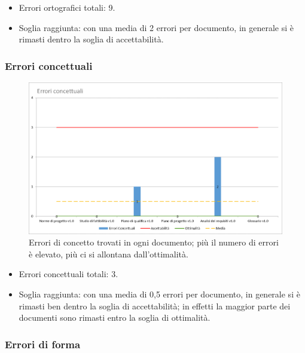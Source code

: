 \begin{itemize}
\item Errori ortografici totali: 9.
\item Soglia raggiunta: con una media di 2 errori per documento, in generale si è rimasti dentro la soglia di accettabilità.
\end{itemize}

\subsubsection{Errori concettuali}

\begin{figure}[h!]
	\centering
	\includegraphics[scale=0.6]{img/Grafici/Errori_conce.png}
	\caption{Errori di concetto trovati in ogni documento; più il numero di errori è elevato, più ci si allontana dall'ottimalità.}
	\label{fig:Errori_conce}
\end{figure}

\begin{itemize}
	\item Errori concettuali totali: 3.
	\item Soglia raggiunta: con una media di 0,5 errori per documento, in generale si è rimasti ben dentro la soglia di accettabilità; in effetti la maggior parte dei documenti sono rimasti entro la soglia di ottimalità.
\end{itemize}

\subsubsection{Errori di forma}

